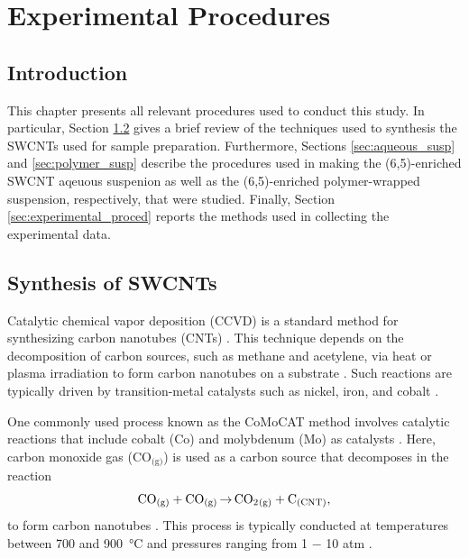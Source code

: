 \chapter{Experimental Procedures}


\section{Introduction}

This chapter presents all relevant procedures used to conduct this study. In particular, Section \ref{section:cnt_synthesis} gives a brief review of the techniques used to synthesis the SWCNTs used for sample preparation. Furthermore, Sections \ref{sec:aqueous_susp} and \ref{sec:polymer_susp} describe the procedures used in making the (6,5)-enriched SWCNT aqeuous suspenion as well as the (6,5)-enriched polymer-wrapped suspension, respectively, that were studied. Finally, Section \ref{sec:experimental_proced} reports the methods used in collecting the experimental data.

\section{Synthesis of SWCNTs}
\label{section:cnt_synthesis}
Catalytic chemical vapor deposition (CCVD) is a standard method for synthesizing carbon nanotubes (CNTs) \cite{prasek2011methods, agboola2007conceptual}. This technique depends on the decomposition of carbon sources, such as methane and acetylene, via heat or plasma irradiation to form carbon nanotubes on a substrate \cite{agboola2007conceptual}. Such reactions are typically driven by transition-metal catalysts such as nickel, iron, and cobalt \cite{prasek2011methods}.

One commonly used process known as the CoMoCAT method involves catalytic reactions that include cobalt (Co) and molybdenum (Mo) as catalysts \cite{resasco2002scalable}. Here, carbon monoxide gas (CO$_\text{(g)}$) is used as a carbon source that decomposes in the reaction
\vspace{-2mm}
\begin{equation}
\label{eq:cnt_synth}
\ce{CO_{(g)} + CO_{(g)} $\rightarrow$ CO_2_{\text{(g)}} + C_{(CNT)}},
\end{equation}
to form carbon nanotubes \cite{resasco2002scalable}. This process is typically conducted at temperatures between 700 and \SI{900}{\celsius} and pressures ranging from 1 $-$ 10 atm \cite{resasco2002scalable}.


